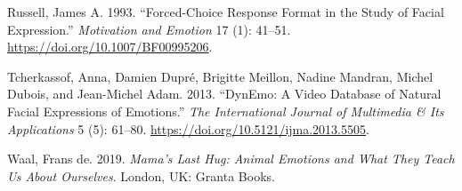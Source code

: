 \documentclass[conference,final,]{IEEEtran}
\begin{document}
\leavevmode\hypertarget{ref-russell1993forced}{}%
Russell, James A. 1993. ``Forced-Choice Response Format in the Study of
Facial Expression.'' \emph{Motivation and Emotion} 17 (1): 41--51.
\url{https://doi.org/10.1007/BF00995206}.

\leavevmode\hypertarget{ref-tcherkassof2013dynemo}{}%
Tcherkassof, Anna, Damien Dupré, Brigitte Meillon, Nadine Mandran,
Michel Dubois, and Jean-Michel Adam. 2013. ``DynEmo: A Video Database of
Natural Facial Expressions of Emotions.'' \emph{The International
Journal of Multimedia \& Its Applications} 5 (5): 61--80.
\url{https://doi.org/10.5121/ijma.2013.5505}.

\leavevmode\hypertarget{ref-de2019mama}{}%
Waal, Frans de. 2019. \emph{Mama's Last Hug: Animal Emotions and What
They Teach Us About Ourselves}. London, UK: Granta Books.
\end{document}
